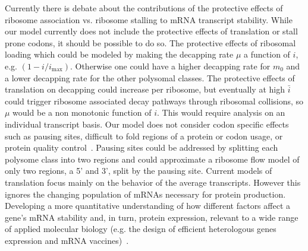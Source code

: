 \documentclass[10pt,letterpaper]{article}
\newcommand{\imax}{\ensuremath{{i_{\max}}}\xspace}
\newcommand{\MRL}{\ensuremath{\bar{i}}\xspace}
\begin{document}
Currently there is debate about the contributions of the protective effects of ribosome association vs. ribosome stalling to mRNA transcript stability.
While our model currently does not include the protective effects of translation or stall prone codons, it should be possible to do so.
The protective effects of ribosomal loading which could be modeled by making the decapping rate $\mu $ a function of $i$, e.g. $(1-i/\imax)$.
Otherwise one could have a higher decapping rate for $m_0$ and a lower decapping rate for the other polysomal classes.
The protective effects of translation on decapping could increase per ribosome, but eventually at high \MRL could trigger ribosome associated decay pathways through ribosomal collisions, so $\mu$ would be a non monotonic function of $i$.
This would require analysis on an individual transcript basis.
Our model does not consider codon specific effects such as pausing sites, difficult to fold regions of a protein or codon usage, or protein quality control~\cite{RN39}.
Pausing sites could be addressed by splitting each polysome class into two regions and could approximate a ribosome flow model of only two regions, a 5' and 3', split by the pausing site.
Current models of translation focus mainly on the behavior of the average transcripts.
However this ignores the changing population of mRNAs necessary for protein production. 
Developing a more quantitative understanding of how different factors affect a gene's mRNA stability and, in turn, protein expression, relevant to a wide range of applied molecular biology (e.g. the design of efficient heterologous genes expression and mRNA vaccines)~\cite{RN40}.
\end{document}
